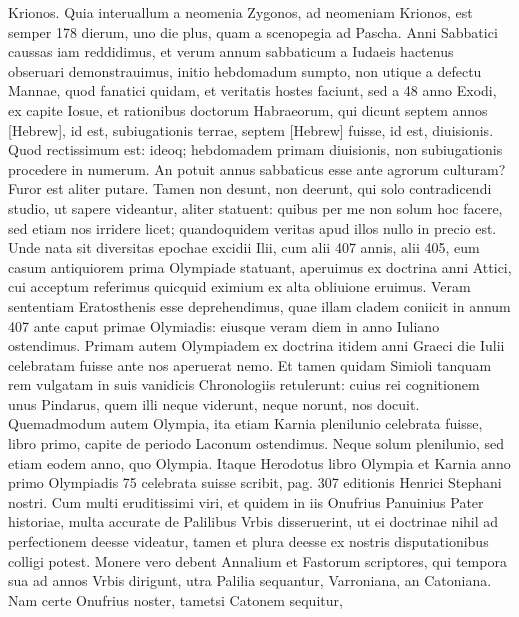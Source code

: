 Krionos.
Quia interuallum a neomenia Zygonos, ad neomeniam
Krionos, est semper 178 dierum, uno die plus, quam a scenopegia
ad Pascha.
Anni Sabbatici caussas iam reddidimus, et verum
annum sabbaticum a Iudaeis hactenus obseruari demonstrauimus,
initio hebdomadum sumpto, non utique a defectu Mannae,
quod fanatici quidam, et veritatis hostes faciunt, sed a 48 anno Exodi,
ex capite  Iosue, et rationibus doctorum Habraeorum, qui
dicunt septem annos \texthebrew{}[Hebrew], id est, subiugationis terrae,
septem \texthebrew{}[Hebrew]
fuisse, id est, diuisionis.
Quod rectissimum est: ideoq; hebdomadem
primam diuisionis, non subiugationis procedere in numerum.
An
potuit annus sabbaticus esse ante agrorum culturam?
Furor est aliter putare.
Tamen non desunt, non deerunt, qui solo contradicendi
studio, ut sapere videantur, aliter statuent: quibus per me non solum
hoc facere, sed etiam nos irridere licet; quandoquidem veritas apud
illos nullo in precio est.
Unde nata sit diversitas epochae excidii Ilii,
cum alii 407 annis, alii 405, eum casum antiquiorem prima Olympiade
statuant, aperuimus ex doctrina anni Attici, cui acceptum
referimus quicquid eximium ex alta obliuione eruimus.
Veram sententiam
Eratosthenis esse deprehendimus, quae illam cladem coniicit
in annum 407 ante caput primae Olymiadis: eiusque veram
diem in anno Iuliano ostendimus.
Primam autem Olympiadem
ex doctrina itidem anni Graeci  die Iulii celebratam fuisse ante
nos aperuerat nemo.
Et tamen quidam Simioli tanquam rem
vulgatam in suis vanidicis Chronologiis retulerunt: cuius rei cognitionem
unus Pindarus, quem illi neque viderunt, neque norunt, nos
docuit.
Quemadmodum autem Olympia, ita etiam Karnia plenilunio
celebrata fuisse, libro primo, capite de periodo Laconum
ostendimus.
%
Neque solum plenilunio, sed etiam eodem anno, quo
Olympia.
Itaque Herodotus libro  Olympia et Karnia anno primo
Olympiadis 75 celebrata suisse scribit, pag. 307 editionis Henrici
Stephani nostri.
Cum multi eruditissimi viri, et quidem in iis
Onufrius Panuinius Pater historiae, multa accurate de Palilibus Vrbis
disseruerint, ut ei doctrinae nihil ad perfectionem deesse videatur,
tamen et plura deesse ex nostris disputationibus colligi potest.
Monere vero debent Annalium et Fastorum scriptores, qui tempora
sua ad annos Vrbis dirigunt, utra Palilia sequantur, Varroniana,
an Catoniana.
Nam certe Onufrius noster, tametsi Catonem sequitur,
